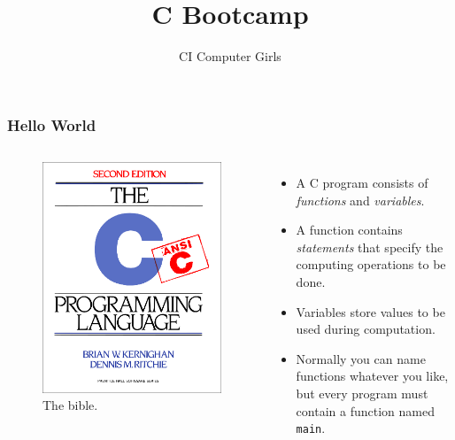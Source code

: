 \documentclass[pdf]{beamer}
\title{C Bootcamp}
\author{CI Computer Girls}
\begin{document}
\begin{frame}
  \titlepage%
\end{frame}

\begin{frame}[fragile]
  \frametitle{Hello World}



  \begin{columns}[c]
    \begin{figure}
      \centering
      \includegraphics[width=\textwidth,keepaspectratio]{kandr}
      \caption{The bible.}
    \end{figure}
    \begin{itemize}
    \item A C program consists of \textit{functions} and \textit{variables}.
      \pause
    \item A function contains \textit{statements} that specify the
      computing operations to be done.
      \pause
    \item Variables store values to be used during computation.
      \pause
    \item Normally you can name functions whatever you like, but every program
      must contain a function named \texttt{main}.
    \end{itemize}
  \end{columns}



\end{frame}
\end{document}
